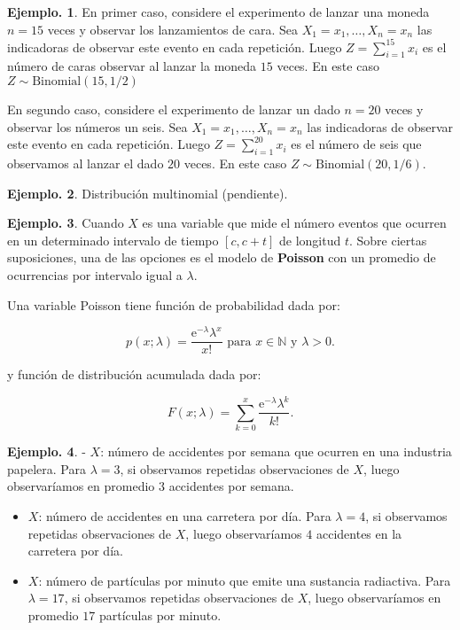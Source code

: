 \documentclass[]{book}
\theoremstyle{definition}
\theoremstyle{definition}
\newtheorem{example}{Ejemplo.}[chapter]
\theoremstyle{definition}
\theoremstyle{remark}
\begin{document}
\begin{example}
\protect\hypertarget{exm:unnamed-chunk-140}{}{\label{exm:unnamed-chunk-140} }
En primer caso, considere el experimento de lanzar una moneda
\(n=15\) veces y observar los lanzamientos de cara. Sea
\(X_1=x_1,\ldots, X_n=x_n\) las indicadoras de observar este
evento en cada repetición. Luego \(Z= \sum_{i=1}^{15}x_i\) es
el número de caras observar al lanzar la moneda \(15\) veces.
En este caso \(Z \sim \mbox{Binomial}(15, 1/2)\)

En segundo caso, considere el experimento de lanzar un dado
\(n=20\) veces y observar los números un seis. Sea
\(X_1=x_1,\ldots, X_n=x_n\) las indicadoras de observar este
evento en cada repetición. Luego \(Z= \sum_{i=1}^{20}x_i\) es
el número de seis que observamos al lanzar el dado \(20\)
veces. En este caso \(Z \sim \mbox{Binomial}(20, 1/6)\).
\end{example}

\begin{example}
\protect\hypertarget{exm:unnamed-chunk-141}{}{\label{exm:unnamed-chunk-141} }
Distribución multinomial (pendiente).
\end{example}

\begin{example}
\protect\hypertarget{exm:unnamed-chunk-142}{}{\label{exm:unnamed-chunk-142} }
Cuando \(X\) es una variable que mide el número eventos que
ocurren en un determinado intervalo de tiempo \([c,c+t]\) de
longitud \(t\). Sobre ciertas suposiciones, una de las opciones es
el modelo de \textbf{Poisson} con un promedio de ocurrencias por
intervalo igual a \(\lambda\).

Una variable Poisson tiene función de probabilidad dada por:

\[ p(x;\lambda)=\frac{ \mbox{e}^{-\lambda}\lambda^{x} }{x!}
   \mbox{ para } x\in \mathbb{N} \mbox{ y } \lambda >0. \]

y función de distribución acumulada dada por:

\[F(x; \lambda)= \sum_{k=0}^{x}
  \frac{\mbox{e}^{-\lambda}\lambda^{k}}{k!}.   \]
\end{example}

\begin{example}
\protect\hypertarget{exm:unnamed-chunk-143}{}{\label{exm:unnamed-chunk-143} }
- \(X\): número de accidentes por semana que ocurren en una
industria papelera. Para \(\lambda=3\), si observamos repetidas
observaciones de \(X\), luego observaríamos en promedio \(3\)
accidentes por semana.

\begin{itemize}
\item
  \(X\): número de accidentes en una carretera por día. Para
  \(\lambda=4\), si observamos repetidas observaciones de \(X\), luego
  observaríamos \(4\) accidentes en la carretera por día.
\item
  \(X\): número de partículas por minuto que emite una
  sustancia radiactiva. Para \(\lambda=17\), si observamos
  repetidas observaciones de \(X\), luego observaríamos en promedio
  \(17\) partículas por minuto.
\end{itemize}
\end{example}
\end{document}

